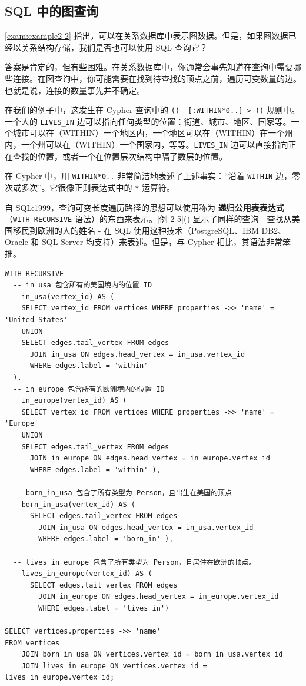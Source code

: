 \subsection{SQL 中的图查询}

\autoref{exam:example2-2} 指出，可以在关系数据库中表示图数据。但是，如果图数据已经以关系结构存储，我们是否也可以使用 SQL 查询它？

答案是肯定的，但有些困难。在关系数据库中，你通常会事先知道在查询中需要哪些连接。在图查询中，你可能需要在找到待查找的顶点之前，遍历可变数量的边。也就是说，连接的数量事先并不确定。

在我们的例子中，这发生在 Cypher 查询中的 \texttt{() -[:WITHIN*0..]-> ()} 规则中。一个人的 \texttt{LIVES\_IN} 边可以指向任何类型的位置：街道、城市、地区、国家等。一个城市可以在（WITHIN）一个地区内，一个地区可以在（WITHIN）在一个州内，一个州可以在（WITHIN）一个国家内，等等。\texttt{LIVES\_IN} 边可以直接指向正在查找的位置，或者一个在位置层次结构中隔了数层的位置。

在 Cypher 中，用 \texttt{WITHIN*0..} 非常简洁地表述了上述事实：“沿着 \texttt{WITHIN} 边，零次或多次”。它很像正则表达式中的 \texttt{*} 运算符。

自 SQL:1999，查询可变长度遍历路径的思想可以使用称为 \textbf{递归公用表表达式}（\texttt{WITH\ RECURSIVE} 语法）的东西来表示。[例 2-5]() 显示了同样的查询 - 查找从美国移民到欧洲的人的姓名 - 在 SQL 使用这种技术（PostgreSQL、IBM DB2、Oracle 和 SQL Server 均支持）来表述。但是，与 Cypher 相比，其语法非常笨拙。

\label{exam:example2-5}
\begin{lstlisting}[caption={与示例 2-4 同样的查询，在 SQL 中使用递归公用表表达式表示}]
WITH RECURSIVE
  -- in_usa 包含所有的美国境内的位置 ID
    in_usa(vertex_id) AS (
    SELECT vertex_id FROM vertices WHERE properties ->> 'name' = 'United States'
    UNION
    SELECT edges.tail_vertex FROM edges
      JOIN in_usa ON edges.head_vertex = in_usa.vertex_id
      WHERE edges.label = 'within'
  ),
  -- in_europe 包含所有的欧洲境内的位置 ID
    in_europe(vertex_id) AS (
    SELECT vertex_id FROM vertices WHERE properties ->> 'name' = 'Europe'
    UNION
    SELECT edges.tail_vertex FROM edges
      JOIN in_europe ON edges.head_vertex = in_europe.vertex_id
      WHERE edges.label = 'within' ),

  -- born_in_usa 包含了所有类型为 Person，且出生在美国的顶点
    born_in_usa(vertex_id) AS (
      SELECT edges.tail_vertex FROM edges
        JOIN in_usa ON edges.head_vertex = in_usa.vertex_id
        WHERE edges.label = 'born_in' ),

  -- lives_in_europe 包含了所有类型为 Person，且居住在欧洲的顶点。
    lives_in_europe(vertex_id) AS (
      SELECT edges.tail_vertex FROM edges
        JOIN in_europe ON edges.head_vertex = in_europe.vertex_id
        WHERE edges.label = 'lives_in')

SELECT vertices.properties ->> 'name'
FROM vertices
    JOIN born_in_usa ON vertices.vertex_id = born_in_usa.vertex_id
    JOIN lives_in_europe ON vertices.vertex_id = lives_in_europe.vertex_id;
\end{lstlisting}

